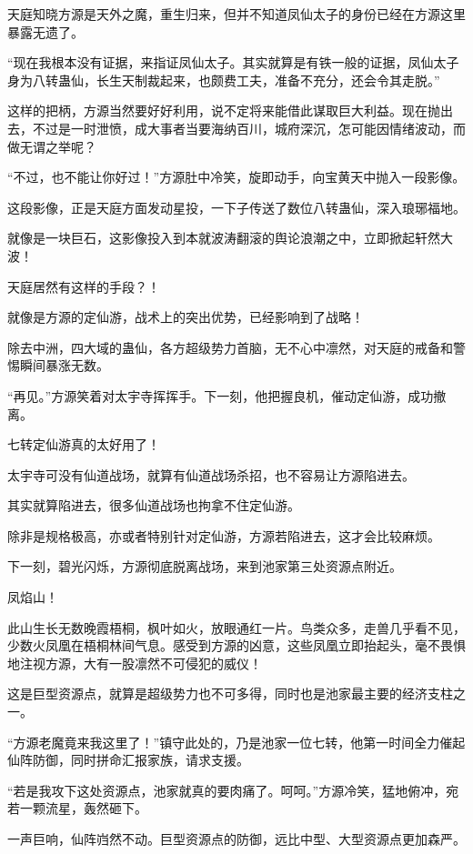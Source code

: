 \begin{this_body}
天庭知晓方源是天外之魔，重生归来，但并不知道凤仙太子的身份已经在方源这里暴露无遗了。

“现在我根本没有证据，来指证凤仙太子。其实就算是有铁一般的证据，凤仙太子身为八转蛊仙，长生天制裁起来，也颇费工夫，准备不充分，还会令其走脱。”

这样的把柄，方源当然要好好利用，说不定将来能借此谋取巨大利益。现在抛出去，不过是一时泄愤，成大事者当要海纳百川，城府深沉，怎可能因情绪波动，而做无谓之举呢？

“不过，也不能让你好过！”方源肚中冷笑，旋即动手，向宝黄天中抛入一段影像。

这段影像，正是天庭方面发动星投，一下子传送了数位八转蛊仙，深入琅琊福地。

就像是一块巨石，这影像投入到本就波涛翻滚的舆论浪潮之中，立即掀起轩然大波！

天庭居然有这样的手段？！

就像是方源的定仙游，战术上的突出优势，已经影响到了战略！

除去中洲，四大域的蛊仙，各方超级势力首脑，无不心中凛然，对天庭的戒备和警惕瞬间暴涨无数。

“再见。”方源笑着对太宇寺挥挥手。下一刻，他把握良机，催动定仙游，成功撤离。

七转定仙游真的太好用了！

太宇寺可没有仙道战场，就算有仙道战场杀招，也不容易让方源陷进去。

其实就算陷进去，很多仙道战场也拘拿不住定仙游。

除非是规格极高，亦或者特别针对定仙游，方源若陷进去，这才会比较麻烦。

下一刻，碧光闪烁，方源彻底脱离战场，来到池家第三处资源点附近。

凤焰山！

此山生长无数晚霞梧桐，枫叶如火，放眼通红一片。鸟类众多，走兽几乎看不见，少数火凤凰在梧桐林间气息。感受到方源的凶意，这些凤凰立即抬起头，毫不畏惧地注视方源，大有一股凛然不可侵犯的威仪！

这是巨型资源点，就算是超级势力也不可多得，同时也是池家最主要的经济支柱之一。

“方源老魔竟来我这里了！”镇守此处的，乃是池家一位七转，他第一时间全力催起仙阵防御，同时拼命汇报家族，请求支援。

“若是我攻下这处资源点，池家就真的要肉痛了。呵呵。”方源冷笑，猛地俯冲，宛若一颗流星，轰然砸下。

一声巨响，仙阵岿然不动。巨型资源点的防御，远比中型、大型资源点更加森严。


\end{this_body}
